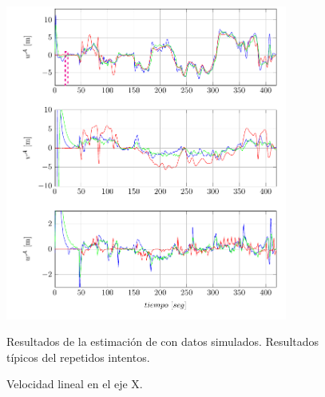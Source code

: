 \documentclass[conference]{IEEEtran}
\begin{document}
\begin{figure}
\begin{center}
\includegraphics[width=25em]
{PlotVelocity1.pdf}
\caption{Velocidad lineal en el eje X.}
\scriptsize{Resultados de la estimación de con datos simulados. Resultados típicos del repetidos intentos.}
\label{PlotU1}
\end{center}
\end{figure}
\end{document}
